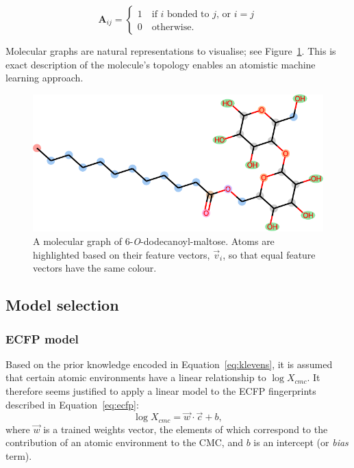 \begin{equation}
    \label{eq:adjacency-mat}
    \mathbf{A}_{ij} = \begin{cases}
        1 \quad \text{if } i \text { bonded to } j \text{, or } i = j \\
        0 \quad \text{otherwise.}
    \end{cases}
\end{equation}

Molecular graphs are natural representations to visualise; see Figure~\ref{fig:mol-graph}. This is exact description of the molecule's topology enables an atomistic machine learning approach.

\begin{figure}
    \centering
    \includegraphics[width=.8\linewidth]{images/molecular-graph.pdf}
    \caption{A molecular graph of 6-\textit{O}-dodecanoyl-maltose. Atoms are
        highlighted based on their feature vectors, $\vec{v}_i$, so that equal
        feature vectors have the same colour.}
    \label{fig:mol-graph}
\end{figure}

\subsection{Model selection}

\subsubsection{ECFP model}

Based on the prior knowledge encoded in Equation~\ref{eq:klevens}, it is
assumed that certain atomic environments have a linear relationship to $\log X_{cmc}$. It therefore seems justified to apply a linear model to the ECFP fingerprints described in Equation~\ref{eq:ecfp}:
\begin{equation}
    \label{eq:linear-ecfp}
    \log X_{cmc} = \vec{w} \cdot \vec{c} + b,
\end{equation}
where $\vec{w}$ is a trained weights vector, the elements of which correspond to the contribution of an atomic environment to the CMC, and $b$ is an intercept (or \emph{bias} term).

